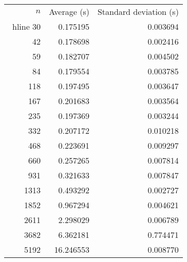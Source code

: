 \begin{tabular}{rrr}
$n$& Average (s) & Standard deviation (s)\\\ hline
30& 0.175195& 0.003694\\
42& 0.178698& 0.002416\\
59& 0.182707& 0.004502\\
84& 0.179554& 0.003785\\
118& 0.197495& 0.003647\\
167& 0.201683& 0.003564\\
235& 0.197369& 0.003244\\
332& 0.207172& 0.010218\\
468& 0.223691& 0.009297\\
660& 0.257265& 0.007814\\
931& 0.321633& 0.007847\\
1313& 0.493292& 0.002727\\
1852& 0.967294& 0.004621\\
2611& 2.298029& 0.006789\\
3682& 6.362181& 0.774471\\
5192& 16.246553& 0.008770\\
\end{tabular}
